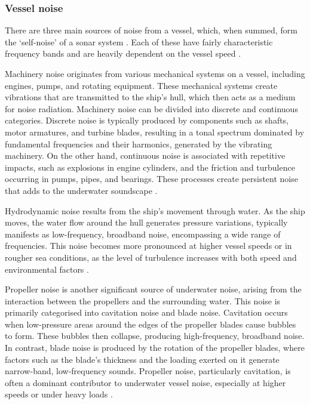 \subsubsection{Vessel noise}

There are three main sources of noise from a vessel, which, when summed, form the `self-noise' of a sonar system \cite{ross_mechanics_1976}. Each of these have fairly characteristic frequency bands and are heavily dependent on the vessel speed \cite{zak_ships_2008}. 

Machinery noise originates from various mechanical systems on a vessel, including engines, pumps, and rotating equipment. These mechanical systems create vibrations that are transmitted to the ship’s hull, which then acts as a medium for noise radiation. Machinery noise can be divided into discrete and continuous categories. Discrete noise is typically produced by components such as shafts, motor armatures, and turbine blades, resulting in a tonal spectrum dominated by fundamental frequencies and their harmonics, generated by the vibrating machinery. On the other hand, continuous noise is associated with repetitive impacts, such as explosions in engine cylinders, and the friction and turbulence occurring in pumps, pipes, and bearings. These processes create persistent noise that adds to the underwater soundscape \cite{zak_ships_2008, chin-hsing_classification_1998}.

Hydrodynamic noise results from the ship's movement through water. As the ship moves, the water flow around the hull generates pressure variations, typically manifests as low-frequency, broadband noise, encompassing a wide range of frequencies. This noise becomes more pronounced at higher vessel speeds or in rougher sea conditions, as the level of turbulence increases with both speed and environmental factors \cite{bjorno_applied_2017}.

Propeller noise is another significant source of underwater noise, arising from the interaction between the propellers and the surrounding water. This noise is primarily categorised into cavitation noise and blade noise. Cavitation occurs when low-pressure areas around the edges of the propeller blades cause bubbles to form. These bubbles then collapse, producing high-frequency, broadband noise. In contrast, blade noise is produced by the rotation of the propeller blades, where factors such as the blade’s thickness and the loading exerted on it generate narrow-band, low-frequency sounds. Propeller noise, particularly cavitation, is often a dominant contributor to underwater vessel noise, especially at higher speeds or under heavy loads \cite{malinowski_underwater_2001}.

